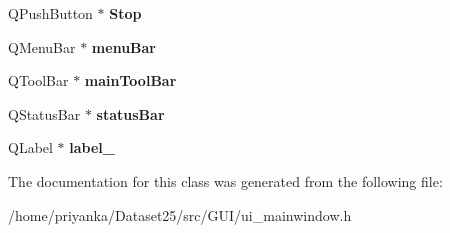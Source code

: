\begin{DoxyCompactItemize}
\item 
\hypertarget{classUi__MainWindow_ade1786a3d33551c3af353c2bc84e8517}{\-Q\-Push\-Button $\ast$ {\bfseries \-Stop}}\label{classUi__MainWindow_ade1786a3d33551c3af353c2bc84e8517}

\item 
\hypertarget{classUi__MainWindow_a2be1c24ec9adfca18e1dcc951931457f}{\-Q\-Menu\-Bar $\ast$ {\bfseries menu\-Bar}}\label{classUi__MainWindow_a2be1c24ec9adfca18e1dcc951931457f}

\item 
\hypertarget{classUi__MainWindow_a5172877001c8c7b4e0f6de50421867d1}{\-Q\-Tool\-Bar $\ast$ {\bfseries main\-Tool\-Bar}}\label{classUi__MainWindow_a5172877001c8c7b4e0f6de50421867d1}

\item 
\hypertarget{classUi__MainWindow_a50fa481337604bcc8bf68de18ab16ecd}{\-Q\-Status\-Bar $\ast$ {\bfseries status\-Bar}}\label{classUi__MainWindow_a50fa481337604bcc8bf68de18ab16ecd}

\item 
\hypertarget{classUi__MainWindow_a9dc4dba26b83e0c94aa566e1c564420b}{\-Q\-Label $\ast$ {\bfseries label\-\_}}\label{classUi__MainWindow_a9dc4dba26b83e0c94aa566e1c564420b}

\end{DoxyCompactItemize}


\-The documentation for this class was generated from the following file\-:\begin{DoxyCompactItemize}
\item 
/home/priyanka/\-Dataset25/src/\-G\-U\-I/ui\-\_\-mainwindow.\-h\end{DoxyCompactItemize}
